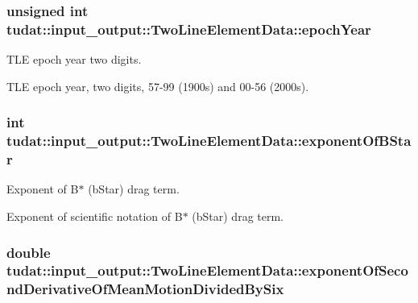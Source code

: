 \subsubsection[{\texorpdfstring{epoch\+Year}{epochYear}}]{\setlength{\rightskip}{0pt plus 5cm}unsigned int tudat\+::input\+\_\+output\+::\+Two\+Line\+Element\+Data\+::epoch\+Year}\hypertarget{structtudat_1_1input__output_1_1TwoLineElementData_ad93bf696554007c87dda49ee3467c3ba}{}\label{structtudat_1_1input__output_1_1TwoLineElementData_ad93bf696554007c87dda49ee3467c3ba}


T\+LE epoch year two digits. 

T\+LE epoch year, two digits, 57-\/99 (1900s) and 00-\/56 (2000s). 
\subsubsection[{\texorpdfstring{exponent\+Of\+B\+Star}{exponentOfBStar}}]{\setlength{\rightskip}{0pt plus 5cm}int tudat\+::input\+\_\+output\+::\+Two\+Line\+Element\+Data\+::exponent\+Of\+B\+Star}\hypertarget{structtudat_1_1input__output_1_1TwoLineElementData_ad20f6d64f169548a1d986947d33f49f4}{}\label{structtudat_1_1input__output_1_1TwoLineElementData_ad20f6d64f169548a1d986947d33f49f4}


Exponent of B$\ast$ (b\+Star) drag term. 

Exponent of scientific notation of B$\ast$ (b\+Star) drag term. 
\subsubsection[{\texorpdfstring{exponent\+Of\+Second\+Derivative\+Of\+Mean\+Motion\+Divided\+By\+Six}{exponentOfSecondDerivativeOfMeanMotionDividedBySix}}]{\setlength{\rightskip}{0pt plus 5cm}double tudat\+::input\+\_\+output\+::\+Two\+Line\+Element\+Data\+::exponent\+Of\+Second\+Derivative\+Of\+Mean\+Motion\+Divided\+By\+Six}\hypertarget{structtudat_1_1input__output_1_1TwoLineElementData_a735f1c6509a3de0d78e86e199d27f31f}{}\label{structtudat_1_1input__output_1_1TwoLineElementData_a735f1c6509a3de0d78e86e199d27f31f}


